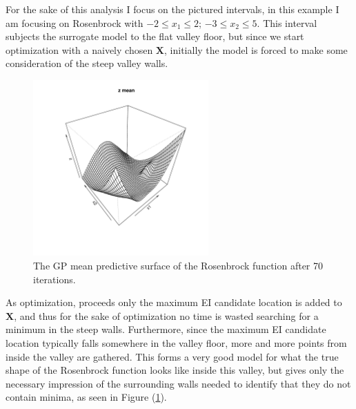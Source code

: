 \documentclass[12pt]{article}
\begin{document}
	For the sake of this analysis I focus on the pictured intervals, in this example I am focusing on Rosenbrock with \mbox{$-2\le x_1\le2$}; \mbox{$-3\le x_2\le5$}.
	This interval subjects the surrogate model to the flat valley floor, but since we start optimization with a naively chosen $\bm{X}$,  initially the model is forced to make some consideration of the steep valley walls.
	
	\begin{figure}
	\vspace{-1.1cm}
	\hspace{-1cm}
	\includegraphics[width=0.6\textwidth]{./figures/gpMeanRosegpPic.pdf}
	\vspace{-2.5cm}
	\caption{The GP mean predictive surface of the Rosenbrock function after 70 iterations. }
	\label{roseGP}
	\end{figure}
	\noindent
	As optimization, proceeds only the maximum EI candidate location is added to $\bm{X}$, and thus for the sake of optimization no time is wasted searching for a minimum in the steep walls. %
	Furthermore, since the maximum EI candidate location typically falls somewhere in the valley floor, more and more points from inside the valley are gathered.
	This forms a very good model for what the true shape of the Rosenbrock function looks like inside this valley, but gives only the necessary impression of the surrounding walls needed to identify that they do not contain minima, as seen in Figure (\ref{roseGP}).
	
\end{document}
